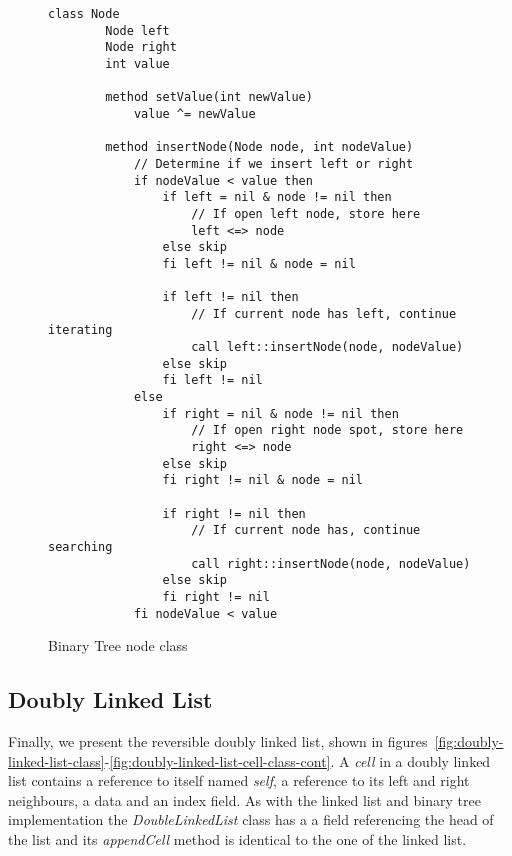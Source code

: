 \begin{figure}[ht!]
    \centering
    \begin{lstlisting}[style = basic, language = roopl] 
    class Node
        Node left
        Node right
        int value
    
        method setValue(int newValue)
            value ^= newValue 
    
        method insertNode(Node node, int nodeValue)
            // Determine if we insert left or right
            if nodeValue < value then
                if left = nil & node != nil then
                    // If open left node, store here
                    left <=> node
                else skip
                fi left != nil & node = nil
    
                if left != nil then
                    // If current node has left, continue iterating
                    call left::insertNode(node, nodeValue)
                else skip
                fi left != nil
            else
                if right = nil & node != nil then
                    // If open right node spot, store here
                    right <=> node
                else skip
                fi right != nil & node = nil
    
                if right != nil then
                    // If current node has, continue searching
                    call right::insertNode(node, nodeValue)
                else skip
                fi right != nil
            fi nodeValue < value
    \end{lstlisting}
    \caption{Binary Tree node class}
    \label{fig:binary-tree-node-class}
\end{figure}


\subsection{Doubly Linked List}
\label{subsec:doubly-linked-list}
Finally, we present the reversible doubly linked list, shown in figures~\ref{fig:doubly-linked-list-class}-\ref{fig:doubly-linked-list-cell-class-cont}. A \textit{cell} in a doubly linked list contains a reference to itself named \textit{self}, a reference to its left and right neighbours, a data and an index field. As with the linked list and binary tree implementation the \textit{DoubleLinkedList} class has a a field referencing the head of the list and its \textit{appendCell} method is identical to the one of the linked list. 

